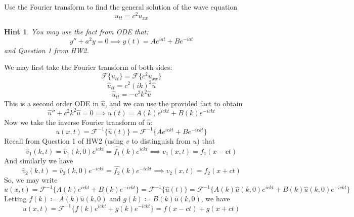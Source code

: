 \documentclass[plain]{pset}
\newtheorem*{hint*}{Hint}
\begin{document}
\begin{problem}
Use the Fourier transform to find the general solution of the wave equation
\[u_{tt} = c^2u_{xx}\]
\begin{hint*}
    You may use the fact from ODE that:
    \[y'' + a^2y = 0 \implies y(t) = Ae^{iat} + Be^{-iat}\]
    and Question 1 from HW2.
\end{hint*}
\end{problem}
\begin{solution}
    We may first take the Fourier transform of both sides:
    \[\mathcal{F}\{u_{tt}\} = \mathcal{F}\{c^2u_{xx}\}\]
    \[\hat{u}_{tt} = c^2(ik)^2\hat{u}\]
    \[\hat{u}_{tt} = -c^2k^2\hat{u}\]
    This is a second order ODE in \(\hat{u}\), and we can use the provided fact to obtain
    \[\hat{u}'' + c^2k^2\hat{u} = 0 \implies \hat{u}(t) = A(k)e^{ickt} + B(k)e^{-ickt}\]
    Now we take the inverse Fourier transform of \(\hat{u}\):
    \[u(x, t) = \mathcal{F}^{-1}\{\hat{u}(t)\} = \mathcal{F}^{-1}\{Ae^{ickt} + Be^{-ickt}\}\]
    Recall from Question 1 of HW2 (using \(v\) to distinguish from \(u\)) that
    \[\hat{v}_1(k, t) = \hat{v}_1(k, 0)e^{ickt} = \hat{f_1}(k)e^{ickt} \implies v_1(x, t) = f_1(x - ct)\]
    And similarly we have
    \[\hat{v}_2(k, t) = \hat{v}_2(k, 0)e^{-ickt} = \hat{f_2}(k)e^{-ickt} \implies v_2(x, t) = f_2(x + ct)\]
    So, we may write
    \[u(x, t) = \mathcal{F}^{-1}\{A(k)e^{ickt} + B(k)e^{-ickt}\} = \mathcal{F}^{-1}\{\hat{u}(t)\} = \mathcal{F}^{-1}\{A(k)\hat{u}(k, 0)e^{ickt} + B(k)\hat{u}(k, 0)e^{-ickt}\}\]
    Letting \(f(k) \coloneqq A(k)\hat{u}(k, 0)\) and \(g(k) \coloneqq B(k)\hat{u}(k, 0)\), we have
    \[u(x, t) = \mathcal{F}^{-1}\{f(k)e^{ickt} + g(k)e^{-ickt}\} = f(x - ct) + g(x + ct)\]
\end{solution}

\pagebreak
\end{document}
